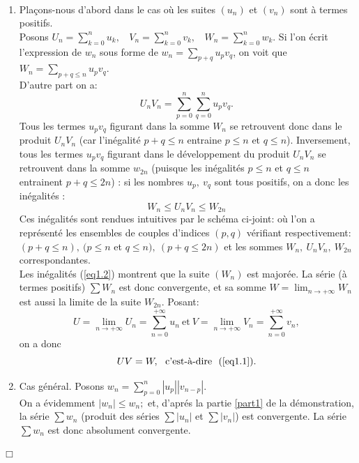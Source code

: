 \documentclass[11pt, a4paper]{book}
\newenvironment{pr}{\noindent {\bf Preuve} \noindent} {\hfill $\Box$\vskip 5mm}
\begin{document}
\begin{pr}\\ 
\begin{enumerate}
\item \label{part1} Pla\c{c}ons-nous d'abord dans le cas o\`u les suites $(u_n)$ et $(v_n)$ sont \`a termes positifs.\\
Posons ${\displaystyle U_n=\sum_{k=0}^n u_k,~~~~V_n=\sum_{k=0}^n v_k,~~~~W_n=\sum_{k=0}^n w_k}$.
 Si l'on \'ecrit l'expression de $w_n$ sous forme de ${\displaystyle w_n=\sum_{p+q}u_p v_q}$,
  on voit que ${\displaystyle W_n=\sum_{p+q \leq n} u_p v_q.}$ \\
D'autre part on a:$$U_n V_n=\sum_{p=0}^n \sum_{q=0}^n u_p v_q.$$
Tous les termes $u_p v_q$ figurant dans la somme $W_n$ se retrouvent donc dans le produit $U_n V_n$ (car l'in\'egalit\'e $p+q\leq n$ entraine $p\leq n$ et $q\leq n$). Inversement, tous les termes $u_p v_q$ figurant dans le d\'eveloppement du produit $U_n V_n$ se retrouvent dans la somme $w_{2n}$ (puisque les in\'egalit\'es $p\leq n$ et $q\leq n$ entrainent $p+q\leq 2n$) : si les nombres $u_p,~ v_q$ sont tous positifs, on a donc les in\'egalit\'es : 
\begin{equation}
 W_n\leq U_n V_n \leq W_{2n} \label{eq1.2}
\end{equation}
Ces in\'egalit\'es sont rendues intuitives par le sch\'ema ci-joint:
o\`u l'on a repr\'esent\'e les ensembles de couples d'indices $(p,q)$ v\'erifiant respectivement: $(p+q\leq n),~ (p\leq n$ et $q\leq n),~(p+q\leq 2n)$ et les sommes $W_n,~U_n V_n,~W_{2n}$ correspondantes.\\
Les in\'egalit\'es (\ref{eq1.2}) montrent que la suite $(W_n)$ est major\'ee. La s\'erie (\`a termes positifs) $\sum W_n$ est donc convergente, et sa somme ${\displaystyle W=\lim_{n\rightarrow+\infty} W_n}$ est aussi la limite de la suite $W_{2n}$. Posant: $$U=\lim_{n\rightarrow+\infty}U_n=\sum_{n=0}^{+\infty} u_n~\text{et}~ V=\lim_{n\rightarrow+\infty}V_n=\sum_{n=0}^{+\infty}v_n,$$ on a donc $$UV=W,~~\text{c'est-\`a-dire}~~ (\ref{eq1.1}).$$
\item Cas g\'en\'eral. Posons ${\displaystyle w_n=\sum_{p=0}^n|u_p||v_{n-p}|}.$ \\ On a \'evidemment $|w_n|\leq w_n;$ et, d'apr\'es la partie \ref{part1} de la d\'emonstration, la s\'erie $\sum w_n$ (produit des s\'eries $\sum|u_n|$ et $\sum|v_n|$) est convergente. La s\'erie $\sum w_n$ est donc absolument convergente.\\

\end{enumerate}
\end{pr}
\end{document}
